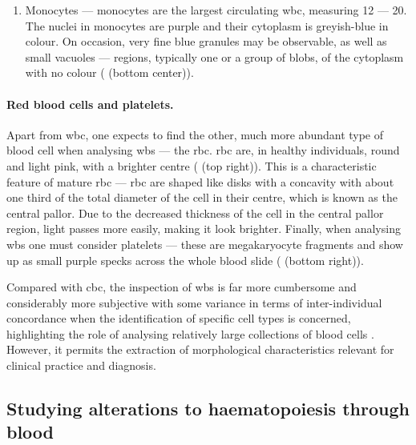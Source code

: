 \begin{enumerate}
    \item{Monocytes} --- monocytes are the largest circulating \ac{wbc}, measuring 12 --- 20\Mum. The nuclei in monocytes are purple and their cytoplasm is greyish-blue in colour. On occasion, very fine blue granules may be observable, as well as small vacuoles --- regions, typically one or a group of blobs, of the cytoplasm with no colour \cite{Bain2014-oc} ( (bottom center)).
\end{enumerate}

\begin{figure}[!ht]
	\label{fig:blood-cell-examples}
\end{figure}
\paragraph{Red blood cells and platelets.} Apart from \ac{wbc}, one expects to find the other, much more abundant type of blood cell when analysing \ac{wbs} --- the \ac{rbc}. \ac{rbc} are, in healthy individuals, round and light pink, with a brighter centre \cite{Bain2014-oc} ( (top right)). This is a characteristic feature of mature \ac{rbc} --- \ac{rbc} are shaped like disks with a concavity with about one third of the total diameter of the cell in their centre, which is known as the central pallor. Due to the decreased thickness of the cell in the central pallor region, light passes more easily, making it look brighter. Finally, when analysing \ac{wbs} one must consider platelets --- these are megakaryocyte fragments and show up as small purple specks across the whole blood slide \cite{Bain2014-oc,Wright1906-af} ( (bottom right)).

Compared with \ac{cbc}, the inspection of \ac{wbs} is far more cumbersome and considerably more subjective with some variance in terms of inter-individual concordance when the identification of specific cell types is concerned, highlighting the role of analysing relatively large collections of blood cells \cite{De_Swart2017-wc}. However, it permits the extraction of morphological characteristics relevant for clinical practice and diagnosis.

\subsection{Studying alterations to haematopoiesis through blood}

